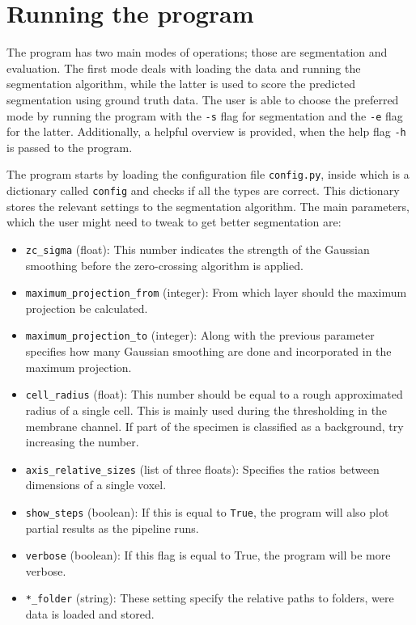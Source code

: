 \documentclass[
  digital,     %
  oneside,     %
  nosansbold,  %
  nocolorbold, %
  lof,         %
  lot,         %
]{fithesis4}
\begin{document}
\section{Running the program}

The program has two main modes of operations; those are segmentation and
evaluation. The first mode deals with loading the data and running the
segmentation algorithm, while the latter is used to score the predicted
segmentation using ground truth data. The user is able to choose the preferred
mode by running the program with the \texttt{-s} flag for segmentation and the
\texttt{-e} flag for the latter. Additionally, a helpful overview is
provided, when the help flag \texttt{-h} is passed to the program.

The program starts by loading the configuration file \texttt{config.py}, inside
which is a dictionary called \texttt{config} and checks if all the types are
correct. This dictionary stores the
relevant settings to the segmentation algorithm. The main parameters, which the
user might need to tweak to get better segmentation are:
\begin{itemize}
    \item \texttt{zc\_sigma} (float): This number indicates the strength of the
        Gaussian smoothing before the zero-crossing algorithm is applied. 
    \item \texttt{maximum\_projection\_from} (integer): From which layer should
        the maximum projection be calculated.
    \item \texttt{maximum\_projection\_to} (integer): Along with the previous
        parameter specifies how many Gaussian smoothing are done and
        incorporated in the maximum projection.
    \item \texttt{cell\_radius} (float): This number should be equal to a rough
        approximated radius of a single cell. This is mainly used during the
        thresholding in the membrane channel. If part of the specimen is
        classified as a background, try increasing the number.
    \item \texttt{axis\_relative\_sizes} (list of three floats): Specifies the
        ratios between dimensions of a single voxel.
    \item \texttt{show\_steps} (boolean): If this is equal to \texttt{True},
        the program will also plot partial results as the pipeline runs.
    \item \texttt{verbose} (boolean): If this flag is equal to True, the program
        will be more verbose.
    \item \texttt{*\_folder} (string): These setting specify the relative paths
        to folders, were data is loaded and stored.
\end{itemize}
\end{document}
